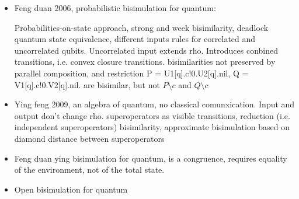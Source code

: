 \begin{itemize}
\item Feng duan 2006, probabilistic bisimulation for quantum:

Probabilities-on-state approach, strong and week bisimilarity, deadlock quantum state equivalence, different inputs rules for correlated and uncorrelated qubits. Uncorrelated input extends rho. Introduces conbined transitions, i.e. convex closure transitions. bisimilarities not preserved by parallel composition, and restriction 
P = U1[q].c!0.U2[q].nil, Q = V1[q].c!0.V2[q].nil. are bisimilar, but not $P\setminus c$ and $Q\setminus c$
\item Ying feng 2009, an algebra of quantum, no classical comunxication. Input and output don't change rho. superoperators as visible transitions, reduction (i.e. independent superoperators) bisimilarity, approximate bisimulation based on diamond distance between superoperators

\item Feng duan ying bisimulation for quantum, is a congruence, requires equality of the environment, not of the total state. 
\item Open bisimulation for quantum
\end{itemize}
